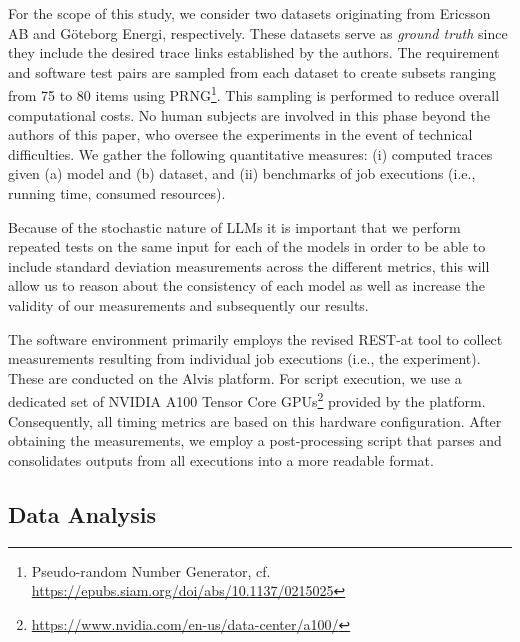 \documentclass[conference]{IEEEtran}
\begin{document}
For the scope of this study, we consider two datasets originating from Ericsson
AB and G\"oteborg Energi, respectively. These datasets serve as \textit{ground
truth} since they include the desired trace links established by the authors.
The requirement and software test pairs are sampled from each dataset to create
subsets ranging from 75 to 80 items using PRNG\footnote{Pseudo-random Number
Generator, cf. \url{https://epubs.siam.org/doi/abs/10.1137/0215025}}. This
sampling is performed to reduce overall computational costs. No human subjects
are involved in this phase beyond the authors of this paper, who oversee the
experiments in the event of technical difficulties. We gather the following
quantitative measures: (i) computed traces given (a) model and (b) dataset, and
(ii) benchmarks of job executions (i.e., running time, consumed resources).

Because of the stochastic nature of LLMs it is important that we perform
repeated tests on the same input for each of the models in order to be able to
include standard deviation measurements across the different metrics, this will
allow us to reason about the consistency of each model as well as increase the
validity of our measurements and subsequently our results.

The software environment primarily employs the revised REST-at tool to collect
measurements resulting from individual job executions (i.e., the experiment).
These are conducted on the Alvis platform. For script execution, we use a
dedicated set of NVIDIA A100 Tensor Core
GPUs\footnote{\url{https://www.nvidia.com/en-us/data-center/a100/}} provided by the
platform. Consequently, all timing metrics are based on this hardware
configuration. After obtaining the measurements, we employ a post-processing
script that parses and consolidates outputs from all executions into a more
readable format.

\subsection{Data Analysis}

\end{document}
